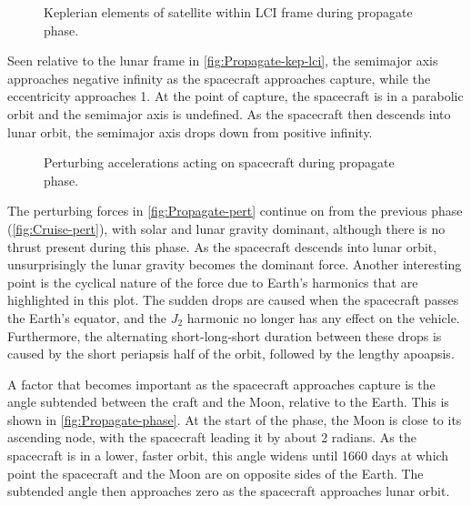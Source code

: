 \begin{figure}
\centering
\def\svgwidth{\figurewidth}

\caption{Keplerian elements of satellite within LCI frame during propagate phase.} \label{fig:Propagate-kep-lci}
\end{figure}

Seen relative to the lunar frame in \autoref{fig:Propagate-kep-lci}, the semimajor axis approaches negative infinity as the spacecraft approaches capture, while the eccentricity approaches 1. At the point of capture, the spacecraft is in a parabolic orbit and the semimajor axis is undefined. As the spacecraft then descends into lunar orbit, the semimajor axis drops down from positive infinity.

\begin{figure}
\centering
\def\svgwidth{\figurewidth}

\caption{Perturbing accelerations acting on spacecraft during propagate phase.} \label{fig:Propagate-pert}
\end{figure}

The perturbing forces in \autoref{fig:Propagate-pert} continue on from the previous phase (\autoref{fig:Cruise-pert}), with solar and lunar gravity dominant, although there is no thrust present during this phase. As the spacecraft descends into lunar orbit, unsurprisingly the lunar gravity becomes the dominant force. Another interesting point is the cyclical nature of the force due to Earth's harmonics that are highlighted in this plot. The sudden drops are caused when the spacecraft passes the Earth's equator, and the $J_2$ harmonic no longer has any effect on the vehicle. Furthermore, the alternating short-long-short duration between these drops is caused by the short periapsis half of the orbit, followed by the lengthy apoapsis.

%

A factor that becomes important as the spacecraft approaches capture is the angle subtended between the craft and the Moon, relative to the Earth. This is shown in \autoref{fig:Propagate-phase}. At the start of the phase, the Moon is close to its ascending node, with the spacecraft leading it by about 2 radians. As the spacecraft is in a lower, faster orbit, this angle widens until 1660 days at which point the spacecraft and the Moon are on opposite sides of the Earth. The subtended angle then approaches zero as the spacecraft approaches lunar orbit.

